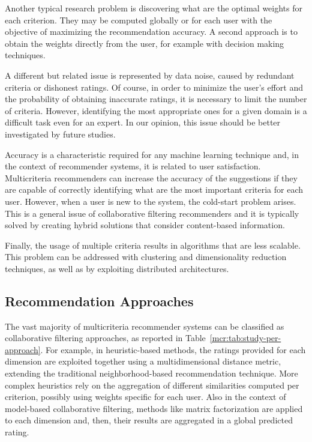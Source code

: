 Another typical research problem is discovering what are the optimal weights for each criterion. They may be computed globally or for each user with the objective of maximizing the recommendation accuracy. A second approach is to obtain the weights directly from the user, for example with decision making techniques.

A different but related issue is represented by data noise, caused by redundant criteria or dishonest ratings. Of course, in order to minimize the user's effort and the probability of obtaining inaccurate ratings, it is necessary to limit the number of criteria. However, identifying the most appropriate ones for a given domain is a difficult task even for an expert. In our opinion, this issue should be better investigated by future studies.

Accuracy is a characteristic required for any machine learning technique and, in the context of recommender systems, it is related to user satisfaction. Multicriteria recommenders can increase the accuracy of the suggestions if they are capable of correctly identifying what are the most important criteria for each user. However, when a user is new to the system, the cold-start problem arises. This is a general issue of collaborative filtering recommenders and it is typically solved by creating hybrid solutions that consider content-based information.

Finally, the usage of multiple criteria results in algorithms that are less scalable. This problem can be addressed with clustering and dimensionality reduction techniques, as well as by exploiting distributed architectures.

\subsection{Recommendation Approaches}

The vast majority of multicriteria recommender systems can be classified as collaborative filtering approaches, as reported in Table~\ref{mcr:tab:study-per-approach}. For example, in heuristic-based methods, the ratings provided for each dimension are exploited together using a multidimensional distance metric, extending the traditional neighborhood-based recommendation technique. More complex heuristics rely on the aggregation of different similarities computed per criterion, possibly using weights specific for each user. Also in the context of model-based collaborative filtering, methods like matrix factorization are applied to each dimension and, then, their results are aggregated in a global predicted rating.

